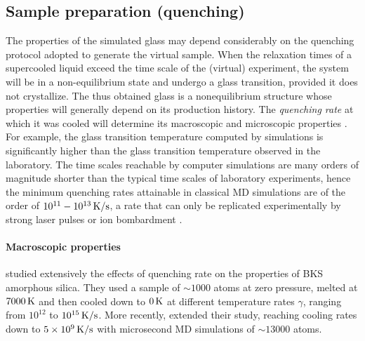 \subsection{Sample preparation (quenching)}  \label{sec:silica-quenching}
The properties of the simulated glass may depend considerably on the quenching protocol adopted to generate the virtual sample. 
When the relaxation times of a supercooled liquid exceed the time scale of the (virtual) experiment, the system will be in a non-equilibrium state and undergo a glass transition, provided it does not crystallize. The thus obtained glass is a nonequilibrium structure whose properties will generally depend on its production history. The \emph{quenching rate} at which it was cooled will determine its macroscopic and microscopic properties \cite{Vollmayr1996}. 
For example, the glass transition temperature computed by simulations is significantly higher than the glass transition temperature observed in the laboratory. 
The time scales reachable by computer simulations are many orders of magnitude shorter than the typical time scales of laboratory experiments, hence the minimum quenching rates attainable in classical MD simulations are of the order of $10^{11}-10^{13}\,\mathrm{K/s}$, a rate that can only be replicated experimentally by strong laser pulses or ion bombardment \cite{Soules2011}.

\paragraph{Macroscopic properties}
\citet{Vollmayr1996} studied extensively the effects of quenching rate on the properties of BKS amorphous silica. They used a sample of $\sim 1000$ atoms at zero pressure, melted at $7000\,\mathrm{K}$ and then cooled down to $0\,\mathrm{K}$ at different temperature rates $\gamma$, ranging from $10^{12}$ to $10^{15}\,\mathrm{K/s}$. More recently, \citet{Lane2015} extended their study, reaching cooling rates down to $5\times 10^{9}\,\mathrm{K/s}$ with microsecond MD simulations of $\sim 13000$ atoms.

